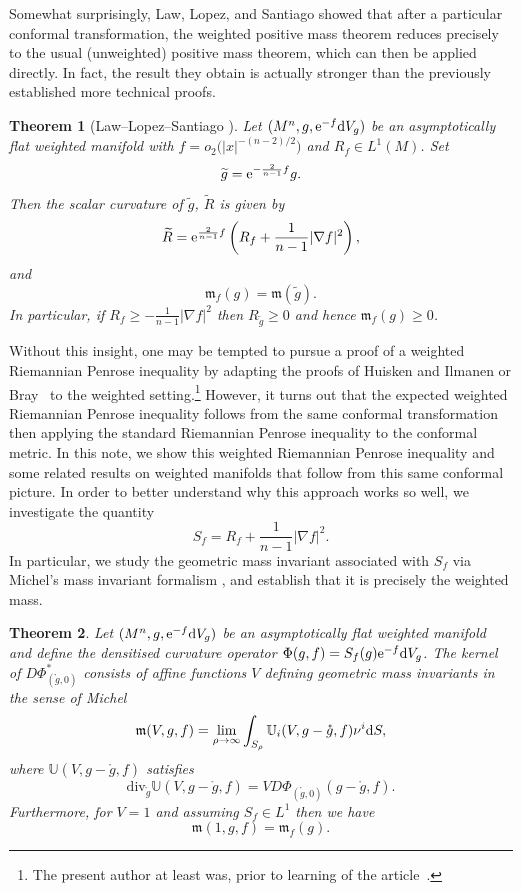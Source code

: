 \documentclass[10pt,a4paper]{amsart}
\numberwithin{equation}{section}
\newtheorem{Theorem}{Theorem}[section]
\theoremstyle{definition}
\begin{document}
Somewhat surprisingly, Law, Lopez, and Santiago \cite{LawLopezSantiago24} showed that after a particular conformal transformation, the weighted positive mass theorem reduces precisely to the usual (unweighted) positive mass theorem, which can then be applied directly. In fact, the result they obtain is actually stronger than the previously established more technical proofs.
\begin{Theorem}[Law--Lopez--Santiago \cite{LawLopezSantiago24}]\label{thm-LLS}
Let $(M^n,g,{\rm e}^{-f}{\rm d}V_g)$ be an asymptotically flat weight\-ed manifold with $f=o_2\bigl(|x|^{-(n-2)/2}\bigr)$ and $R_f\in L^1(M)$. Set
	\[
	\widetilde g = {\rm e}^{-\frac{2}{n-1}f} g.
	\]
	Then the scalar curvature of $\widetilde g$, $\widetilde R$ is given by
	\[
	\widetilde R = {\rm e}^{\frac{2}{n-1}f}\left(R_f + \frac{1}{n-1} |\nabla f|^2\right),
	\]
	and
	\[
	\mathfrak{m}_f(g) = \mathfrak{m}(\widetilde g).
	\]
	In particular, if $R_f\ge -\frac{1}{n-1}|\nabla f|^2$ then $R_{\widetilde g}\ge 0$ and hence $\mathfrak{m}_f(g)\ge 0$.
\end{Theorem}

Without this insight, one may be tempted to pursue a proof of a weighted Riemannian Penrose inequality by adapting the proofs of Huisken and Ilmanen \cite{HuiskenIlmanen01} or Bray~\cite{Bray01} to the weighted setting.\footnote{The present author at least was, prior to learning of the article~\cite{LawLopezSantiago24}.} However, it turns out that the expected weighted Riemannian Penrose inequality follows from the same conformal transformation then applying the standard Riemannian Penrose inequality to the conformal metric. In this note, we show this weighted Riemannian Penrose inequality and some related results on weighted manifolds that follow from this same conformal picture. In order to better understand why this approach works so well, we investigate the quantity
\[
S_f=R_f+\frac{1}{n-1}|\nabla f|^2.
\] In particular, we study the geometric mass invariant associated with $S_f$ via Michel's mass invariant formalism \cite{Michel11}, and establish that it is precisely the weighted mass.

\begin{Theorem}\label{thm-Michel}
	Let $(M^n,g,{\rm e}^{-f}{\rm d}V_g)$ be an asymptotically flat weighted manifold and define the densitised curvature operator $\Phi(g,f)=S_f(g) {\rm e}^{-f}{\rm d}V_g$. The kernel of $D\Phi^*_{(\mathring g,0)}$ consists of affine functions $V$ defining geometric mass invariants in the sense of Michel~{\rm \cite{Michel11}}
	\begin{equation*}
		\mathfrak{m}(V,g,f)=\lim_{\rho\to\infty}\int_{S_\rho}\mathbb U_i(V,g-\mathring g,f) \nu^i{\rm d}S,
	\end{equation*}
	where $\mathbb U(V,g-\mathring g,f)$ satisfies
	\[
		\mathrm{div}_{\mathring g}\mathbb U(V,g-\mathring g,f)=V  D\Phi_{(\mathring g,0)}(g-\mathring g,f).
	\]
	Furthermore, for $V=1$ and assuming $S_f\in L^1$ then we have
	\[
		\mathfrak{m}(1,g,f)=\mathfrak{m}_f(g).
	\]
\end{Theorem}
\end{document}
